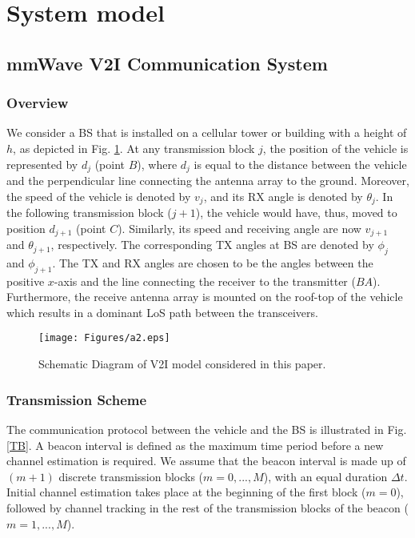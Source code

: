 \documentclass{ieeeaccess}
\begin{document}
\section{System model}\label{System model}
\subsection{mmWave V2I Communication System}
\subsubsection{Overview}
We consider a BS that is installed on a cellular tower or building with a height of $h$, as depicted in Fig. \ref{f1}. At any transmission block $j$, the position of the vehicle is represented by $d_j$ (point $B$), where $d_j$ is equal to the distance between the vehicle and the perpendicular line connecting the antenna array to the ground. Moreover, the speed of the vehicle is denoted by $v_j$, and its RX angle is denoted by $\theta_j$. In the following transmission block ($j+1$), the vehicle would have, thus, moved to position $d_{j+1}$ (point $C$). Similarly, its speed and receiving angle are now $v_{j+1}$ and $\theta_{j+1}$, respectively. The corresponding TX angles at BS are denoted by $\phi_j$ and $\phi_{j+1}$. The TX and RX angles are chosen to be the angles between the positive $x$-axis and the line connecting the receiver to the transmitter ($BA$). Furthermore, the receive antenna array is mounted on the roof-top of the vehicle which results in a dominant LoS path between the transceivers.

\begin{figure}[t!]
\centering
\texttt{[image: Figures/a2.eps]}
\caption{Schematic Diagram of V2I model considered in this paper.}
\label{f1}
\end{figure}

\subsubsection{Transmission Scheme}

The communication protocol between the vehicle and the BS is illustrated in Fig. \ref{TB}. A beacon interval is defined as the maximum time period before a new channel estimation is required. We assume that the beacon interval is made up of $(m+1)$ discrete transmission blocks ($m=0,...,M$), with an equal duration $\Delta t$. Initial channel estimation takes place at the beginning of the first block ($m=0$), followed by channel tracking in the rest of the transmission blocks of the beacon ($m=1,...,M$).
\end{document}
